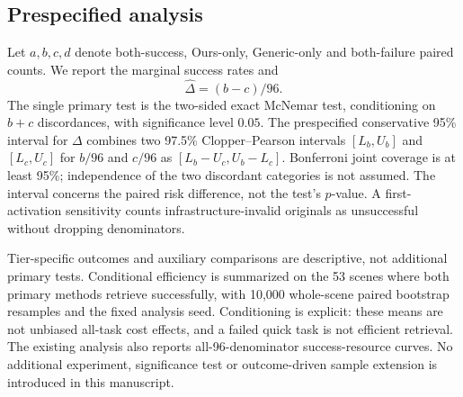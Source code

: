 \subsection{Prespecified analysis}
\label{sec:analysis}
Let $a,b,c,d$ denote both-success, Ours-only, Generic-only and both-failure paired
counts. We report the marginal success rates and
\begin{equation}
 \widehat\Delta=(b-c)/96.
 \label{eq:effect}
\end{equation}
The single primary test is the two-sided exact McNemar test, conditioning on
$b+c$ discordances, with significance level $0.05$. The prespecified conservative
95\% interval for $\Delta$ combines two 97.5\% Clopper--Pearson intervals
$[L_b,U_b]$ and $[L_c,U_c]$ for $b/96$ and $c/96$ as
$[L_b-U_c,U_b-L_c]$. Bonferroni joint coverage is at least 95\%; independence of
the two discordant categories is not assumed. The interval concerns the paired
risk difference, not the test's $p$-value. A first-activation sensitivity counts
infrastructure-invalid originals as unsuccessful without dropping denominators.

Tier-specific outcomes and auxiliary comparisons are descriptive, not additional
primary tests. Conditional efficiency is summarized on the 53 scenes where both
primary methods retrieve successfully, with 10,000 whole-scene paired bootstrap
resamples and the fixed analysis seed. Conditioning is explicit: these means
are not unbiased all-task cost effects, and a failed quick task is not efficient
retrieval. The existing analysis also reports all-96-denominator success-resource
curves. No additional experiment, significance test or outcome-driven sample
extension is introduced in this manuscript.
